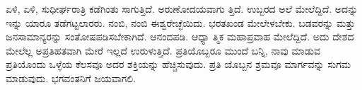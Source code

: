 ಏಳಿ, ಏಳಿ, ಸುಧೀರ್ಘರಾತ್ರಿ ಕಡೆಗಿಂತು ಸಾಗುತ್ತಿದೆ. ಅರುಣೋದಯವಾಗು ತ್ತಿದೆ. ಉಬ್ಬರದ ಅಲೆ ಮೇಲೆದ್ದಿದೆ. ಅದನ್ನು ಇನ್ನು ಯಾರೂ ತಡೆಗಟ್ಟಲಾರರು. ನಂಬಿ, ನಂಬಿ ಈಶ್ವರೇಚ್ಛೆಯಿದು. ಭರತಖಂಡ ಮೇಲೇಳಬೇಕು. ಬಡವರನ್ನು ಮತ್ತು ಜನಸಾಮಾನ್ಯರನ್ನು ಸಂತೋಷಪಡಿಸಬೇಕಾಗಿದೆ. ಆನಂದಪಡಿ. ಆಧ್ಯಾ ತ್ಮಿಕ ಮಹಾಪ್ರವಾಹ ಮೇಲೆದ್ದಿದೆ. ಅದು ದೇಶದ ಮೇಲೆಲ್ಲ ಅಪ್ರತಿಹತವಾಗಿ ಮೇರೆ ಇಲ್ಲದೆ ಉರುಳುತ್ತಿದೆ. ಪ್ರತಿಯೊಬ್ಬರೂ ಮುಂದೆ ಬನ್ನಿ, ನಾವು ಮಾಡುವ ಪ್ರತಿಯೊಂದು ಒಳ್ಳೆಯ ಕೆಲಸವೂ ಅದರ ಶಕ್ತಿಯನ್ನು ಹೆಚ್ಚಿಸುವುದು. ಪ್ರತಿ ಯೊಬ್ಬನ ಶ್ರಮವೂ ಮಾರ್ಗವನ್ನು ಸುಗಮ ಮಾಡುವುದು. ಭಗವಂತನಿಗೆ ಜಯವಾಗಲಿ.

